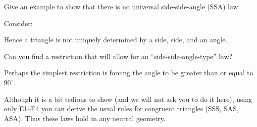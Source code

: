 \documentclass[instructornotes]{ximera}
\begin{document}
\begin{problem}
Give an example to show that there is no universal side-side-angle (SSA) law.

\begin{freeResponse}
Consider:
\begin{image}
\end{image}
Hence a triangle is not uniquely determined by a side, side, and an angle. 
\end{freeResponse}

Can you find a restriction that will allow for an ``side-side-angle-type'' law?
\begin{freeResponse}
Perhaps the simplest restriction is forcing the angle to be greater
than or equal to $90^\circ$.
\end{freeResponse}
\end{problem}

Although it is a bit tedious to show (and we will not ask you to do it
here), using only E1--E4 you can derive the usual rules for congruent
triangles (SSS, SAS, ASA). Thus these laws hold in any neutral
geometry.
\end{document}
